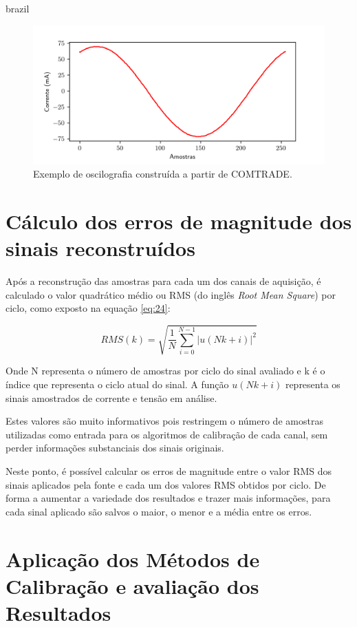 \begin{otherlanguage*}{brazil}
\begin{figure}[H]
    \centering
    \includegraphics[width=14cm]{pictures/sig_corr_reconst.png}
    \caption{Exemplo de oscilografia construída a partir de COMTRADE.}
    \label{fig:sig_corr_reconst}
\end{figure}

\section{Cálculo dos erros de magnitude dos sinais reconstruídos}

Após a reconstrução das amostras para cada um dos canais de aquisição, é calculado o valor quadrático médio ou RMS (do inglês \textit{Root Mean Square}) por ciclo, como exposto na equação \ref{eq:24}:

\begin{equation}\label{eq:24}
RMS(k) = \sqrt{\frac{1}{N} \sum_{i=0}^{N - 1} |u(Nk + i)|^2}
\end{equation} 

Onde N representa o número de amostras por ciclo do sinal avaliado e k é o índice que representa o ciclo atual do sinal. A função $u(Nk + i)$ representa os sinais amostrados de corrente e tensão em análise.

Estes valores são muito informativos pois restringem o número de amostras utilizadas como entrada para os algoritmos de calibração de cada canal, sem perder informações substanciais dos sinais originais. 

Neste ponto, é possível calcular os erros de magnitude entre o valor RMS dos sinais aplicados pela fonte e cada um dos valores RMS obtidos por ciclo. De forma a aumentar a variedade dos resultados e trazer mais informações, para cada sinal aplicado são salvos o maior, o menor e a média entre os erros. 

\section{Aplicação dos Métodos de Calibração e avaliação dos Resultados}


\end{otherlanguage*}
